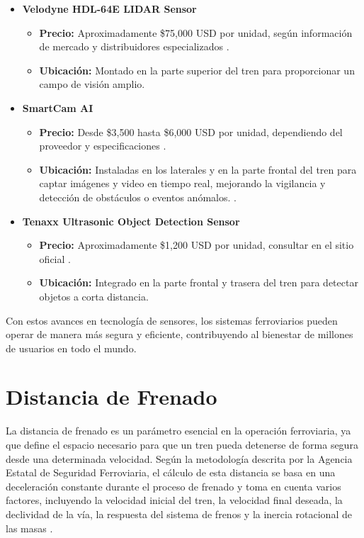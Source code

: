 \documentclass[journal]{IEEEtran}
\begin{document}
\begin{itemize}  
    \item \textbf{Velodyne HDL-64E LIDAR Sensor}   
        \begin{itemize}  
            \item \textbf{Precio:} Aproximadamente \$75,000 USD por unidad, según información de mercado y distribuidores especializados \cite{lidar2023}.  
            \item \textbf{Ubicación:} Montado en la parte superior del tren para proporcionar un campo de visión amplio.  
        \end{itemize} 
    \item \textbf{SmartCam AI}  
        \begin{itemize}  
            \item \textbf{Precio:} Desde \$3,500 hasta \$6,000 USD por unidad, dependiendo del proveedor y especificaciones \cite{avigilon2023}.  
            \item \textbf{Ubicación:} Instaladas en los laterales y en la parte frontal del tren para captar imágenes y video en tiempo real, mejorando la vigilancia y detección de obstáculos o eventos anómalos. \cite{moxa2024}. 
        \end{itemize} 
    \item \textbf{Tenaxx Ultrasonic Object Detection Sensor}  
        \begin{itemize}  
            \item \textbf{Precio:} Aproximadamente \$1,200 USD por unidad, consultar en el sitio oficial \cite{tenaxx2024}.  
            \item \textbf{Ubicación:} Integrado en la parte frontal y trasera del tren para detectar objetos a corta distancia.  
        \end{itemize}  
\end{itemize}  

Con estos avances en tecnología de sensores, los sistemas ferroviarios pueden operar de manera más segura y eficiente, contribuyendo al bienestar de millones de usuarios en todo el mundo.  

\section{Distancia de Frenado}

La distancia de frenado es un parámetro esencial en la operación ferroviaria, ya que define el espacio necesario para que un tren pueda detenerse de forma segura desde una determinada velocidad. Según la metodología descrita por la Agencia Estatal de Seguridad Ferroviaria, el cálculo de esta distancia se basa en una deceleración constante durante el proceso de frenado y toma en cuenta varios factores, incluyendo la velocidad inicial del tren, la velocidad final deseada, la declividad de la vía, la respuesta del sistema de frenos y la inercia rotacional de las masas \cite{aesf2023}.
\end{document}
